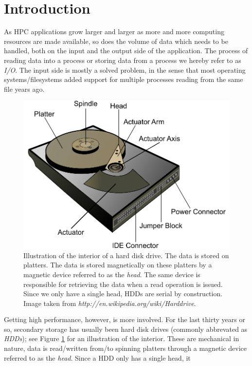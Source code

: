 \documentclass[twoside, 11pt, a4paper]{article}
\begin{document}
\section{Introduction}
As HPC applications grow larger and larger as more and more computing resources are
made available, so does the volume of data which needs to be handled, both
on the input and the output side of the application. The process of reading data into
a process or storing data from a process we hereby refer to as \emph{I/O}. The input side is mostly 
a solved problem, in the sense that most operating systems/filesystems added support
for multiple processes reading from the same file years ago.
\begin{figure}[ht]
	\begin{center}
		\includegraphics[width=12cm]{Hard_drive-en}
	\end{center}
	\caption{Illustration of the interior of a hard disk drive. The data is stored on 
			 platters. The data is stored magnetically on these platters by
			 a magnetic device referred to as the \emph{head}. The same device
			 is responsible for retrieving the data when a read operation is issued.
			 Since we only have a single head, HDDs are serial by construction.
			 Image taken from \emph{http://en.wikipedia.org/wiki/Harddrive}.}
	\label{fig:hdd}
\end{figure}
Getting high performance, however, is more involved. For the last thirty years or so,
secondary storage has usually been hard disk drives (commonly abbrevated as \emph{HDDs});
see Figure \ref{fig:hdd} for an illustration of the interior. 
These are mechanical in nature, data is read/written from/to spinning platters through 
a magnetic device referred to as the \emph{head}. Since a HDD only has a single head, it
\end{document}

